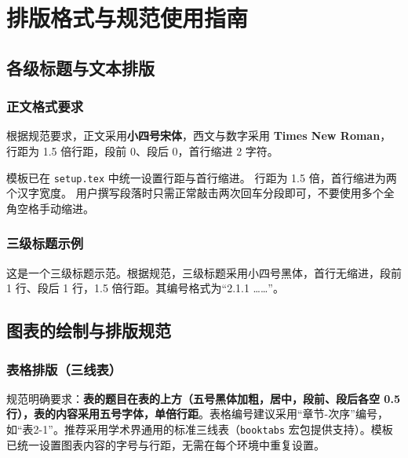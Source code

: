 
\chapter{排版格式与规范使用指南}

\section{各级标题与文本排版}

\subsection{正文格式要求}
根据规范要求，正文采用\textbf{小四号宋体}，西文与数字采用 \textbf{Times New Roman}，行距为 1.5 倍行距，段前 0、段后 0，首行缩进 2 字符。

模板已在 \texttt{setup.tex} 中统一设置行距与首行缩进。
行距为 1.5 倍，首行缩进为两个汉字宽度。
用户撰写段落时只需正常敲击两次回车分段即可，不要使用多个全角空格手动缩进。

\subsection{三级标题示例}
这是一个三级标题示范。根据规范，三级标题采用小四号黑体，首行无缩进，段前 1 行、段后 1 行，1.5 倍行距。其编号格式为“2.1.1 ……”。

\section{图表的绘制与排版规范}

\subsection{表格排版（三线表）}
规范明确要求：\textbf{表的题目在表的上方（五号黑体加粗，居中，段前、段后各空 0.5 行），表的内容采用五号字体，单倍行距}。表格编号建议采用“章节-次序”编号，如“表2-1”。推荐采用学术界通用的标准三线表（\texttt{booktabs} 宏包提供支持）。模板已统一设置图表内容的字号与行距，无需在每个环境中重复设置。

